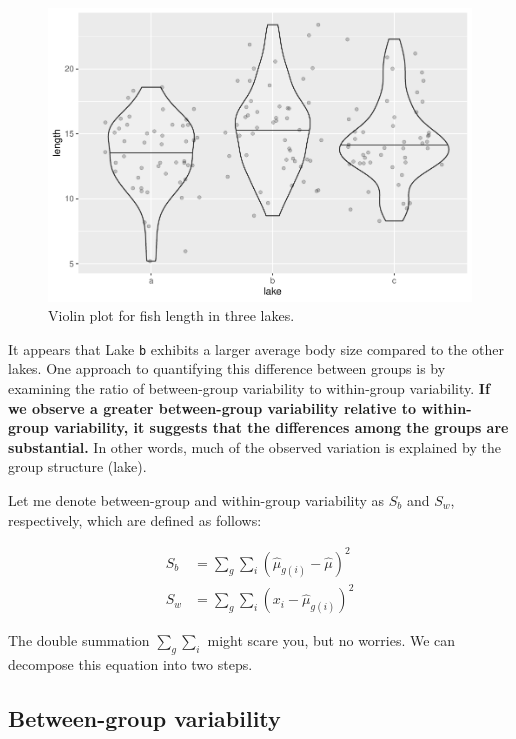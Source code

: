 \documentclass[
]{book}
\begin{document}
\begin{figure}

{\centering \includegraphics{biostats_files/figure-latex/violin-1} 

}

\caption{Violin plot for fish length in three lakes.}\label{fig:violin}
\end{figure}

It appears that Lake \texttt{b} exhibits a larger average body size compared to the other lakes. One approach to quantifying this difference between groups is by examining the ratio of between-group variability to within-group variability. \textbf{If we observe a greater between-group variability relative to within-group variability, it suggests that the differences among the groups are substantial.} In other words, much of the observed variation is explained by the group structure (lake).

Let me denote between-group and within-group variability as \(S_b\) and \(S_w\), respectively, which are defined as follows:

\[
\begin{aligned}
S_b &= \sum_g \sum_i (\hat{\mu}_{g(i)} - \hat{\mu})^2\\
S_w &= \sum_g \sum_i (x_{i} - \hat{\mu}_{g(i)})^2
\end{aligned}
\]

The double summation \(\sum_g \sum_i\) might scare you, but no worries. We can decompose this equation into two steps.

\hypertarget{between-group-variability}{%
\subsection{Between-group variability}\label{between-group-variability}}
\end{document}
